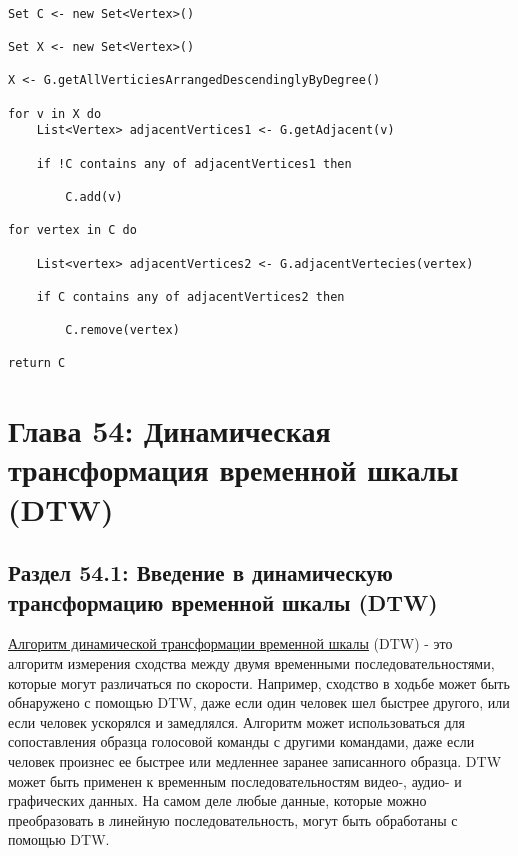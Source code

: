 \begin{tcolorbox}
\begin{verbatim}

Set C <- new Set<Vertex>()

Set X <- new Set<Vertex>()

X <- G.getAllVerticiesArrangedDescendinglyByDegree()

for v in X do
    List<Vertex> adjacentVertices1 <- G.getAdjacent(v)
    
    if !C contains any of adjacentVertices1 then

        C.add(v)
        
for vertex in C do

    List<vertex> adjacentVertices2 <- G.adjacentVertecies(vertex)
    
    if C contains any of adjacentVertices2 then

        C.remove(vertex)

return C

\end{verbatim}
\end{tcolorbox}


\vspace{\baselineskip}
\vspace{-0.2cm}

\chapter*{Глава 54:  Динамическая трансформация временной шкалы (DTW)}
\section*{Раздел 54.1: Введение в динамическую трансформацию временной шкалы (DTW)}

\href{https://en.wikipedia.org/wiki/Dynamic_time_warping}{\underline{Алгоритм динамической трансформации временной шкалы}} (DTW) - это алгоритм измерения сходства между двумя временными последовательностями, которые могут различаться по скорости. Например, сходство в ходьбе может быть обнаружено с помощью DTW, даже если один человек шел быстрее другого, или если человек ускорялся и замедлялся. Алгоритм может использоваться для сопоставления образца голосовой команды с другими командами, даже если человек произнес ее быстрее или медленнее заранее записанного образца. DTW может быть применен к временным последовательностям видео-, аудио- и графических данных. На самом деле любые данные, которые можно преобразовать в линейную последовательность, могут быть обработаны с помощью DTW.

